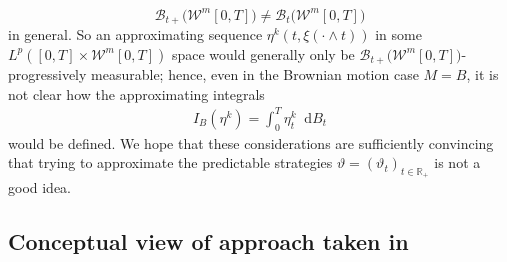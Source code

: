\documentclass[11pt]{report}
\newcommand{\diff}{\mathop{}\!\mathrm{d}}
\theoremstyle{plain} %
\theoremstyle{definition} %
\theoremstyle{remark} %
\begin{document}
\begin{equation}
    \mathcal{B}_{t+}\bigl(\mathcal{W}^m[0,T]\bigr)\neq \mathcal{B}_{t}\bigl(\mathcal{W}^m[0,T]\bigr)
\end{equation}
in general. So an approximating sequence \(\eta^k(t,\xi(\cdot\wedge t))\) in some \(L^p([0,T]\times\mathcal{W}^m[0,T])\) space would generally only be \(\mathcal{B}_{t+}\bigl(\mathcal{W}^m[0,T]\bigr)\)-progressively measurable; hence, even in the Brownian motion case \(M=B\), it is not clear how the approximating integrals 
\begin{align}
    I_{B}(\eta^k)=\int_0^T\eta^k_t\diff B_t
\end{align}
would be defined. We hope that these considerations are  sufficiently convincing that trying to approximate the predictable strategies \(\vartheta=(\vartheta_t)_{t\in\mathbb{R}_+}\) is not a good idea. 
\subsection{Conceptual view of approach taken in \parencite[Chapter.~5]{Arandjelovic2025}}\label{sec:main ideas of alexandar}
\end{document}
